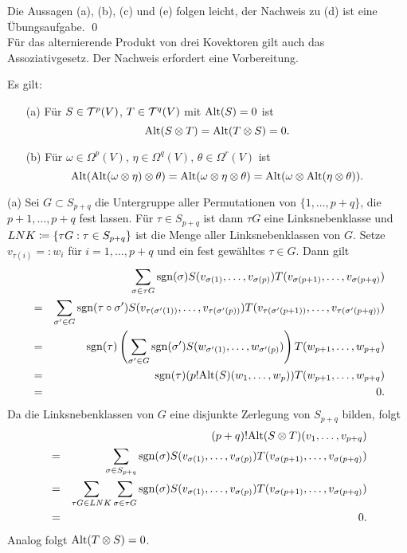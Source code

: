 \documentclass[a4paper,twoside,DIV15,BCOR12mm]{scrbook}
\DeclareMathOperator{\sgn}{sgn}
\begin{document}
\bigskip

 Die Aussagen (a), (b), (c) und (e) folgen 
leicht, der Nachweis zu (d) ist eine Übungsaufgabe. \qed\\

\noindent
Für das alternierende Produkt von drei Kovektoren gilt auch das 
Assoziativgesetz. Der Nachweis erfordert eine Vorbereitung.

\bigskip

\begin{lemma}\label{Lemma3.3.4} {Es gilt:}
\begin{enumerate}
\item[{\rm (a)}] {Für $S \in {\cal T}^{p}(V)$, $T \in {\cal T}^{q}(V)$ mit 
${\rm Alt}(S) = 0$ ist}
\[ {\rm Alt}(S \otimes T) = {\rm Alt}(T \otimes S) = 0. \]
\item[{\rm (b)}] {Für $\omega \in \Omega^{p}(V)$, $\eta \in \Omega^{q}(V)$, 
$\theta \in \Omega^{r}(V)$ ist}
\[ {\rm Alt}({\rm Alt}(\omega \otimes \eta) \otimes \theta) = {\rm 
Alt}(\omega \otimes \eta \otimes \theta) = {\rm Alt}(\omega \otimes 
{\rm Alt}(\eta \otimes \theta)). \]
\end{enumerate}
\end{lemma}

\bigskip

 (a) Sei $G \subset S_{p+q}$ die Untergruppe 
aller Permutationen von $\{1,\dots,p+q\}$, die $p+1,\dots,p+q$ fest 
lassen. Für $\tau \in S_{p+q}$ ist dann $\tau G$ eine 
Linksnebenklasse und $LNK \da  \{\tau G: \tau \in S_{p+q}\}$ ist die 
Menge aller Linksnebenklassen von $G$. Setze $v_{\tau(i)} =: 
w_{i}$ für $i = 1,\dots,p+q$ und ein fest gewähltes $\tau \in 
G$. Dann gilt
\begin{eqnarray*}
&   & \sum_{\sigma \in \tau G} \sgn (\sigma) 
S(v_{\sigma(1)},\dots,v_{\sigma(p)}) 
T(v_{\sigma(p+1)},\dots,v_{\sigma(p+q)}) \\
& = & \sum_{\sigma' \in G} \sgn (\tau \circ \sigma') 
S(v_{\tau(\sigma'(1))},\dots,v_{\tau(\sigma'(p))}) 
T(v_{\tau(\sigma'(p+1))},\dots,v_{\tau(\sigma'(p+q))}) \\
& = & \sgn (\tau) \left(\sum_{\sigma' \in G} \sgn (\sigma') 
S(w_{\sigma'(1)},\dots,w_{\sigma'(p)})\right) 
T(w_{p+1},\dots,w_{p+q}) \\
& = & \sgn (\tau) (p! {\rm 
Alt}(S)(w_{1},\dots,w_{p}))T(w_{p+1},\dots,w_{p+q}) \\
& = & 0.
\end{eqnarray*}
Da die Linksnebenklassen von $G$ eine disjunkte Zerlegung von 
$S_{p+q}$ bilden, folgt
\begin{eqnarray*}
&   & (p+q)! {\rm Alt}(S \otimes T)(v_{1},\dots,v_{p+q}) \\
& = & \sum_{\sigma \in S_{p+q}} \sgn (\sigma) 
S(v_{\sigma(1)},\dots,v_{\sigma(p)}) 
T(v_{\sigma(p+1)},\dots,v_{\sigma(p+q)}) \\
& = & \sum_{\tau G \in LNK} \sum_{\sigma \in \tau G} {\rm 
sgn}(\sigma) S(v_{\sigma(1)},\dots,v_{\sigma(p)}) 
T(v_{\sigma(p+1)},\dots,v_{\sigma(p+q)}) \\
& = & 0.
\end{eqnarray*}
Analog folgt ${\rm Alt}(T \otimes S) = 0$.\\
\end{document}

